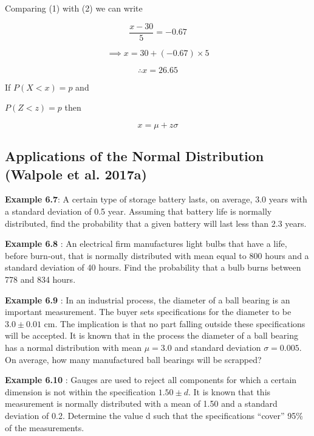\documentclass[
  11pt,
  letterpaper,
  DIV=11,
  numbers=noendperiod]{scrreprt}
\begin{document}
Comparing (1) with (2) we can write

\[\frac{x-30}{5}=-0.67\]

\[\implies x=30+(-0.67)\times 5\]

\[\therefore x=26.65\]

\begin{tcolorbox}[enhanced jigsaw, bottomrule=.15mm, toprule=.15mm, title=\textcolor{quarto-callout-note-color}{\faInfo}\hspace{0.5em}{Note}, bottomtitle=1mm, colframe=quarto-callout-note-color-frame, coltitle=black, rightrule=.15mm, toptitle=1mm, colbacktitle=quarto-callout-note-color!10!white, titlerule=0mm, breakable, arc=.35mm, leftrule=.75mm, opacitybacktitle=0.6, opacityback=0, colback=white, left=2mm]

If \(P(X<x)=p\) and

\(P(Z<z)=p\) then

\[x=\mu+z\sigma\]

\end{tcolorbox}

\subsection{Applications of the Normal Distribution (Walpole et al.
2017a)}\label{applications-of-the-normal-distribution-walpole2017}

\textbf{Example 6.7}: A certain type of storage battery lasts, on
average, 3.0 years with a standard deviation of 0.5 year. Assuming that
battery life is normally distributed, find the probability that a given
battery will last less than 2.3 years.

\textbf{Example 6.8} : An electrical firm manufactures light bulbs that
have a life, before burn-out, that is normally distributed with mean
equal to 800 hours and a standard deviation of 40 hours. Find the
probability that a bulb burns between 778 and 834 hours.

\textbf{Example 6.9} : In an industrial process, the diameter of a ball
bearing is an important measurement. The buyer sets specifications for
the diameter to be \(3.0 \pm 0.01\) cm. The implication is that no part
falling outside these specifications will be accepted. It is known that
in the process the diameter of a ball bearing has a normal distribution
with mean \(\mu = 3.0\) and standard deviation \(\sigma = 0.005\). On
average, how many manufactured ball bearings will be scrapped?

\textbf{Example 6.10} : Gauges are used to reject all components for
which a certain dimension is not within the specification
\(1.50 \pm d\). It is known that this measurement is normally
distributed with a mean of 1.50 and a standard deviation of 0.2.
Determine the value d such that the specifications ``cover'' 95\% of the
measurements.
\end{document}
